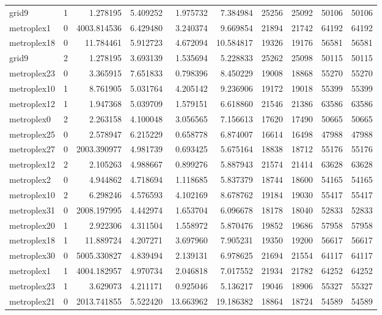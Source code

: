 \begin{longtable}{|l|r|r|r|r|r|r|r|r|r|}
grid9 & 1 & 1.278195 & 5.409252 & 1.975732 & 7.384984 & 25256 & 25092 & 50106 & 50106 \\
metroplex1 & 0 & 4003.814536 & 6.429480 & 3.240374 & 9.669854 & 21894 & 21742 & 64192 & 64192 \\
metroplex18 & 0 & 11.784461 & 5.912723 & 4.672094 & 10.584817 & 19326 & 19176 & 56581 & 56581 \\
grid9 & 2 & 1.278195 & 3.693139 & 1.535694 & 5.228833 & 25262 & 25098 & 50115 & 50115 \\
metroplex23 & 0 & 3.365915 & 7.651833 & 0.798396 & 8.450229 & 19008 & 18868 & 55270 & 55270 \\
metroplex10 & 1 & 8.761905 & 5.031764 & 4.205142 & 9.236906 & 19172 & 19018 & 55399 & 55399 \\
metroplex12 & 1 & 1.947368 & 5.039709 & 1.579151 & 6.618860 & 21546 & 21386 & 63586 & 63586 \\
metroplex0 & 2 & 2.263158 & 4.100048 & 3.056565 & 7.156613 & 17620 & 17490 & 50665 & 50665 \\
metroplex25 & 0 & 2.578947 & 6.215229 & 0.658778 & 6.874007 & 16614 & 16498 & 47988 & 47988 \\
metroplex27 & 0 & 2003.390977 & 4.981739 & 0.693425 & 5.675164 & 18838 & 18712 & 55176 & 55176 \\
metroplex12 & 2 & 2.105263 & 4.988667 & 0.899276 & 5.887943 & 21574 & 21414 & 63628 & 63628 \\
metroplex2 & 0 & 4.944862 & 4.718694 & 1.118685 & 5.837379 & 18744 & 18600 & 54165 & 54165 \\
metroplex10 & 2 & 6.298246 & 4.576593 & 4.102169 & 8.678762 & 19184 & 19030 & 55417 & 55417 \\
metroplex31 & 0 & 2008.197995 & 4.442974 & 1.653704 & 6.096678 & 18178 & 18040 & 52833 & 52833 \\
metroplex20 & 1 & 2.922306 & 4.311504 & 1.558972 & 5.870476 & 19852 & 19686 & 57958 & 57958 \\
metroplex18 & 1 & 11.889724 & 4.207271 & 3.697960 & 7.905231 & 19350 & 19200 & 56617 & 56617 \\
metroplex30 & 0 & 5005.330827 & 4.839494 & 2.139131 & 6.978625 & 21694 & 21554 & 64117 & 64117 \\
metroplex1 & 1 & 4004.182957 & 4.970734 & 2.046818 & 7.017552 & 21934 & 21782 & 64252 & 64252 \\
metroplex23 & 1 & 3.629073 & 4.211171 & 0.925046 & 5.136217 & 19046 & 18906 & 55327 & 55327 \\
metroplex21 & 0 & 2013.741855 & 5.522420 & 13.663962 & 19.186382 & 18864 & 18724 & 54589 & 54589 \\

\end{longtable}
